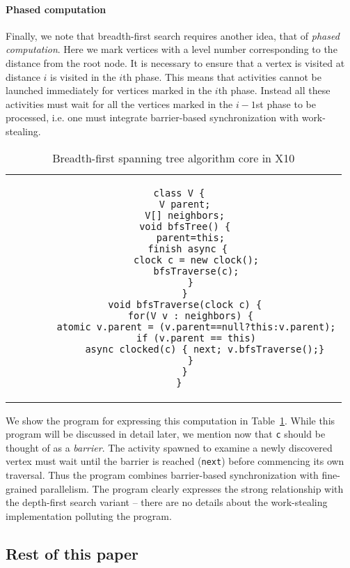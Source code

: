\documentclass[10pt]{article}
\numberwithin{equation}{section}
\def\Xten{{\sf X10}}
\begin{document}
\paragraph{Phased computation}
Finally, we note that breadth-first search requires another idea, that
of {\em phased computation}. Here we mark vertices with a level number
corresponding to the distance from the root node. It is necessary to
ensure that a vertex is visited at distance $i$ is visited in the
$i$th phase. This means that activities cannot be launched immediately
for vertices marked in the $i$th phase. Instead all these activities
must wait for all the vertices marked in the $i-1$st phase to be
processed, i.e.{} one must integrate barrier-based synchronization
with work-stealing.

\begin{table}
\centering
\scriptsize
\begin{tabular}{c}
\begin{minipage}[t]{0.5\textwidth}
\begin{verbatim} 
  class V {
    V parent;
    V[] neighbors;
    void bfsTree() {
      parent=this;
      finish async { 
        clock c = new clock();
        bfsTraverse(c);
      }
    }
    void bfsTraverse(clock c) {
      for(V v : neighbors) {
        atomic v.parent = (v.parent==null?this:v.parent);
        if (v.parent == this)
           async clocked(c) { next; v.bfsTraverse();}
      }
    }
  }
\end{verbatim}
\end{minipage} 
\end{tabular}
\caption{Breadth-first spanning tree algorithm core in \Xten}
\label{alg:bfs-x10}
\end{table}

We show the program for expressing this computation in
Table~\ref{alg:bfs-x10}. While this program will be discussed in
detail later, we mention now that {\tt c} should be thought of as a
{\em barrier}. The activity spawned to examine a newly discovered
vertex must wait until the barrier is reached ({\tt next}) before
commencing its own traversal. Thus the program combines barrier-based
synchronization with fine-grained parallelism. The program clearly
expresses the strong relationship with the depth-first search variant
-- there are no details about the work-stealing implementation
polluting the program.

\subsection{Rest of this paper}
\end{document}
